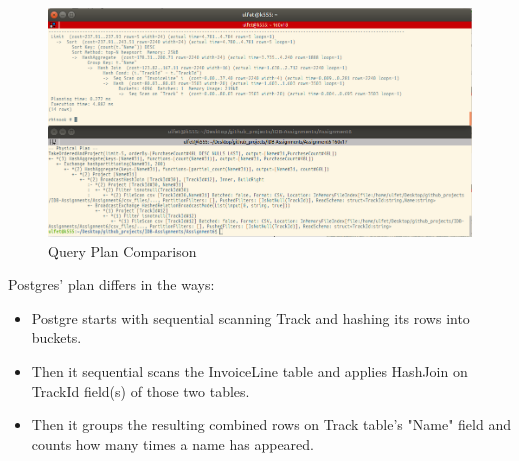 \documentclass[10pt]{article}
\begin{document}
\begin{enumerate}

		
		
		\bigskip
		\begin{figure}[H]
			\centering
			\includegraphics[scale=0.45]{compare_plans.png}
			\caption{Query Plan Comparison}
		\end{figure}
		\bigskip
		

		
		\bigskip
		Postgres' plan differs in the ways:
		\begin{itemize}
			\item Postgre starts with sequential scanning Track and hashing its rows into buckets.
			
			\item Then it sequential scans the InvoiceLine table and applies HashJoin on TrackId field(s) of those two tables.
			
			\item Then it groups the resulting combined rows on Track table's "Name" field and counts how many times a name has appeared.
			

\end{itemize}
\end{enumerate}
\end{document}

